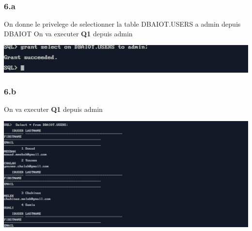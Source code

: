 \subsubsection*{6.a}
On donne le privelege de selectionner la table DBAIOT.USERS a admin depuis DBAIOT
On va executer \textbf{Q1} depuis admin



\begin{center}
    \includegraphics[width=\textwidth]{ScreenShot/Partie4/grantselect.png}
\end{center}

\subsubsection*{6.b}
On va executer \textbf{Q1} depuis admin



\begin{center}
    \includegraphics[width=\textwidth]{ScreenShot/Partie4/select1.png}
\end{center}


